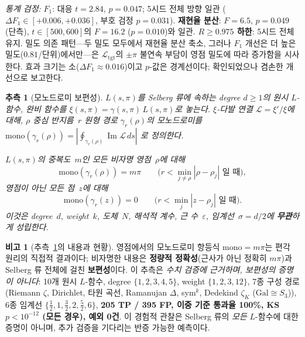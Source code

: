 \documentclass[11pt, a4paper]{article}
\theoremstyle{definition}
\newtheorem{remark}{비고}[section]
\theoremstyle{plain}
\newtheorem{conjecture}[theorem]{추측}
\newcommand{\Ltgt}{\mathcal{L}_{\mathrm{tgt}}}
\begin{document}
\begin{itemize}
        \smallskip\noindent
        \emph{통계 검정:}
        \textbf{$F_1$}: 대응 $t{=}2.84$, $p{=}0.047$;
        5시드 전체 방향 일관
        ($\Delta F_1 \in [+0.006, +0.036]$,
        부호 검정 $p{=}0.031$).
        \textbf{재현율 분산}: $F{=}6.5$, $p{=}0.049$
        (단측), $t\in[500,600]$의 $F{=}16.2$ ($p{=}0.010$)와 일관.
        \textbf{$R{\ge}0.975$ 하한}: 5시드 전체 유지.
        밀도 의존 패턴---두 밀도 모두에서 재현율 분산 축소,
        그러나 $F_1$ 개선은 더 높은 밀도($0.81$/단위)에서만---은
        $\Ltgt$의 $\pm\pi$ 불연속 부담이 영점 밀도에 따라
        증가함을 시사한다.
        효과 크기는 소($\Delta F_1 \approx 0.016$)이고
        $p$-값은 경계선이다; 확인되었으나 겸손한 개선으로
        보고한다.
\end{itemize}

\begin{conjecture}[모노드로미 보편성]
\label{conj:mono_universality}
$L(s,\pi)$를 Selberg 류에 속하는 degree $d \geq 1$의 원시 $L$-함수,
완비 함수를 $\xi(s,\pi) = \gamma(s,\pi)\,L(s,\pi)$로 놓는다.
$\xi$-다발 연결 $\mathcal{L} = \xi'/\xi$에 대해,
$\rho$ 중심 반지름~$r$ 원형 경로 $\gamma_r(\rho)$의 모노드로미를
$\mathrm{mono}(\gamma_r(\rho))
= |\oint_{\gamma_r(\rho)} \operatorname{Im}\mathcal{L}\,ds|$
로 정의한다.

$L(s,\pi)$의 중복도~$m$인 모든 비자명 영점~$\rho$에 대해
\[
  \mathrm{mono}(\gamma_r(\rho)) = m\pi
  \qquad
  \text{($r < \min_{j\neq\rho}|\rho - \rho_j|$ 일 때)},
\]
영점이 아닌 모든 점~$z$에 대해
\[
  \mathrm{mono}(\gamma_r(z)) = 0
  \qquad
  \text{($r < \min_j |z - \rho_j|$ 일 때)}.
\]
이것은 degree~$d$, weight~$k$, 도체~$N$, 해석적 계수,
근 수~$\varepsilon$, 임계선~$\sigma = d/2$에 \textbf{무관}하게 성립한다.
\end{conjecture}

\begin{remark}[추측~\ref{conj:mono_universality}의 내용과 현황]
\label{rem:mono_universality_content}
영점에서의 모노드로미 항등식 $\mathrm{mono} = m\pi$는 편각 원리의
직접적 결과이다; 비자명한 내용은 \textbf{정량적 정확성}(근사가 아닌 정확히 $m\pi$)과
Selberg 류 전체에 걸친 \textbf{보편성}이다.
이 추측은 \emph{수치 검증에 근거하며, 보편성의 증명이 아니다}:
10개 원시 $L$-함수, degree $\{1,2,3,4,5\}$, weight $\{1,2,3,12\}$,
7종 구성 경로(Riemann $\zeta$, Dirichlet, 타원 곡선, Ramanujan $\Delta$,
sym$^k$, Dedekind $\zeta_K$ ($\mathrm{Gal}\cong S_3$)),
6종 임계선 $\{\tfrac12,1,\tfrac32,2,\tfrac52,6\}$,
\textbf{205 TP / 395 FP, 이중 기준 통과율 100\%,
KS $p < 10^{-12}$ (모든 경우), 예외 0건}.
이 경험적 관찰은 Selberg 류의 \emph{모든} $L$-함수에 대한 증명이 아니며,
추가 검증을 기다리는 반증 가능한 예측이다.
\end{remark}
\end{document}
